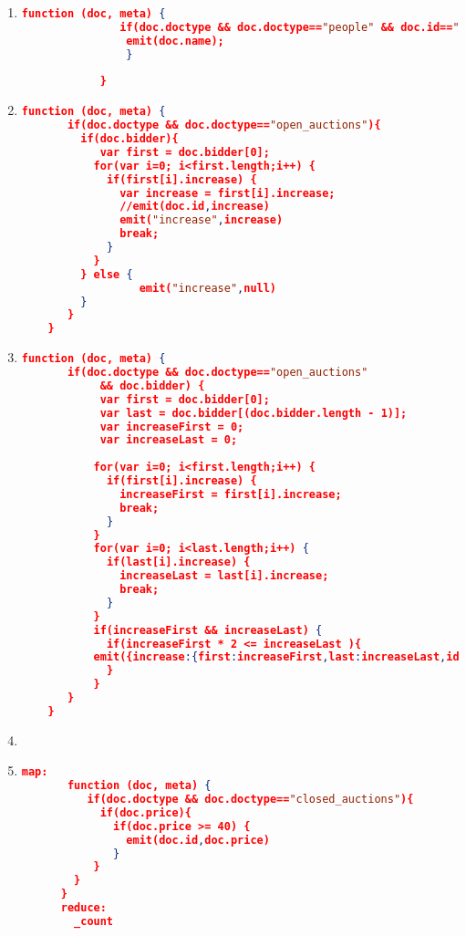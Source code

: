 \label{xmark-queries-couchbase}
\begin{enumerate}[label=Q\arabic*.]
	\item %
	\begin{lstlisting}[language=JSON, basicstyle=\scriptsize]
			function (doc, meta) {
			   if(doc.doctype && doc.doctype=="people" && doc.id=="person0"){
				emit(doc.name);	   
			    }
			  
			}
		\end{lstlisting}

	\item %
	\begin{lstlisting}[language=JSON, basicstyle=\scriptsize]
	function (doc, meta) {
	   if(doc.doctype && doc.doctype=="open_auctions"){
	     if(doc.bidder){
	     	var first = doc.bidder[0];
	       for(var i=0; i<first.length;i++) {
	         if(first[i].increase) {
	           var increase = first[i].increase;
	           //emit(doc.id,increase)
	           emit("increase",increase)
	           break;
	         }
	       }
	     } else {
	     	      emit("increase",null)
	     }
	   }
	}
	\end{lstlisting}
	
    \item %
	\begin{lstlisting}[language=JSON, basicstyle=\scriptsize]
	  function (doc, meta) {
       if(doc.doctype && doc.doctype=="open_auctions" 
            && doc.bidder) {
         	var first = doc.bidder[0];
           	var last = doc.bidder[(doc.bidder.length - 1)];
            var increaseFirst = 0;
            var increaseLast = 0;
           
           for(var i=0; i<first.length;i++) {
             if(first[i].increase) {
               increaseFirst = first[i].increase;
               break;
             }
           }
           for(var i=0; i<last.length;i++) {
             if(last[i].increase) {
               increaseLast = last[i].increase;
               break;
             }
           }
           if(increaseFirst && increaseLast) {
             if(increaseFirst * 2 <= increaseLast ){
    	   emit({increase:{first:increaseFirst,last:increaseLast,id:doc.id}});
             }
           } 
       }
    }
	\end{lstlisting}
	
	
    \item %
	\par
	
	
    \item %
	\begin{lstlisting}[language=JSON, basicstyle=\scriptsize]
	map:
	   function (doc, meta) {
	      if(doc.doctype && doc.doctype=="closed_auctions"){
	        if(doc.price){
	          if(doc.price >= 40) {
	            emit(doc.id,doc.price)
	          }
	       }
	    }
	  }
	  reduce: 
	    _count
	\end{lstlisting}
	

\end{enumerate}
